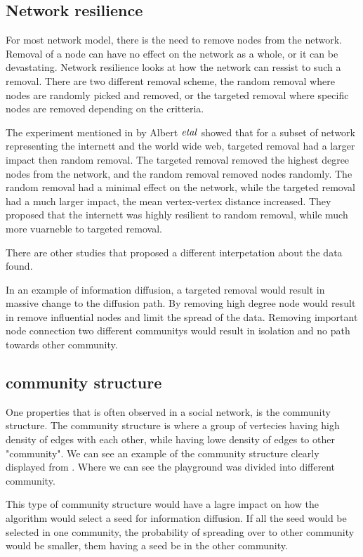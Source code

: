 \subsection{Network resilience}
For most network model, there is the need to remove nodes from the network. Removal of a node can have no effect on the network as a whole, or it can be devastating. Network resilience looks at how the network can ressist to such a removal. There are two different removal scheme, the random removal where nodes are randomly picked and removed, or the targeted removal where specific nodes are removed depending on the critteria. 

The experiment mentioned in \cite{complexNetwork} by Albert $\it{et al}$ showed that for a subset of network representing the internett and the world wide web, targeted removal had a larger impact then random removal. The targeted removal removed the highest degree nodes from the network, and the random removal removed nodes randomly. The random removal had a minimal effect on the network, while the targeted removal had a much larger impact, the mean vertex-vertex distance increased. They proposed that the internett was highly resilient to random removal, while much more vuarneble to targeted removal. 

There are other studies that proposed a different interpetation about the data found.	

In an example of information diffusion, a targeted removal would result in massive change to the diffusion path. By removing high degree node would result in remove influential nodes and limit the spread of the data. Removing important node connection two different communitys would result in isolation and no path towards other community.

\subsection{community structure}
One properties that is often observed in a social network, is the community structure. The community structure is where a group of vertecies having high density of edges with each other, while having lowe density of edges to other "community". We can see an example of the community structure clearly displayed from \cite{RaceSchool2001}. Where we can see the playground was divided into different community.

This type of community structure would have a lagre impact on how the algorithm would select a seed for information diffusion. If all the seed would be selected in one community, the probability of spreading over to other community would be smaller, them having a seed be in the other community.

